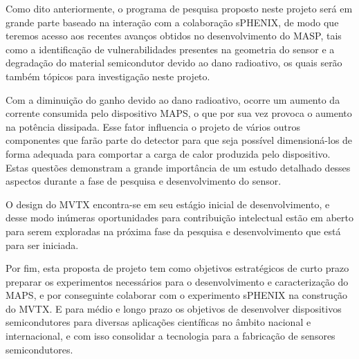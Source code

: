 Como dito anteriormente, o programa de pesquisa proposto neste projeto será em grande parte baseado na interação com a colaboração sPHENIX, de modo que teremos acesso aos recentes avanços obtidos no desenvolvimento do MASP, tais como a identificação de vulnerabilidades presentes na geometria do sensor e a degradação do material semicondutor devido ao dano radioativo, os quais serão também tópicos para investigação neste projeto.

Com a diminuição do ganho devido ao dano radioativo, ocorre um aumento da corrente consumida pelo dispositivo MAPS, o que por sua vez provoca o aumento na potência dissipada. Esse fator influencia o projeto de vários outros componentes que farão parte do detector para que seja possível dimensioná-los de forma adequada para comportar a carga de calor produzida pelo dispositivo. Estas questões demonstram a grande importância de um estudo detalhado desses aspectos durante a fase de pesquisa e desenvolvimento do sensor. 

O design do MVTX encontra-se em seu estágio inicial de desenvolvimento, e desse modo inúmeras oportunidades para contribuição intelectual estão em aberto para serem exploradas na próxima fase da pesquisa e desenvolvimento que está para ser iniciada. 


Por fim, esta proposta de projeto tem como objetivos estratégicos de curto prazo preparar os experimentos necessários para o desenvolvimento e caracterização do MAPS, e por conseguinte colaborar com o experimento sPHENIX na construção do MVTX. E para médio e longo prazo os objetivos de desenvolver dispositivos semicondutores para diversas aplicações científicas no âmbito nacional e internacional, e com isso consolidar a tecnologia para a fabricação de sensores semicondutores.















